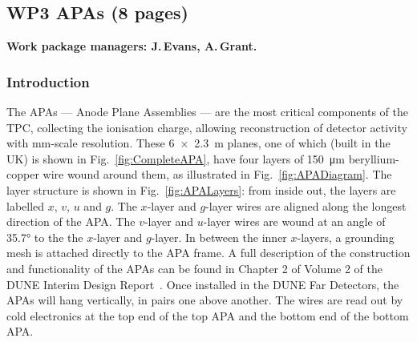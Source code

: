 \subsection{WP3 APAs (8 pages)}

{\bf Work package managers: J.\,Evans, A.\,Grant.}

\subsubsection{Introduction}

The APAs --- Anode Plane Assemblies --- are the most critical components of the TPC, collecting the ionisation charge, allowing reconstruction of detector activity with mm-scale resolution. These \SI{6x 2.3}{\metre} planes, one of which (built in the UK) is shown in Fig.~\ref{fig:CompleteAPA}, have four layers of \SI{150}{\micro\metre} beryllium-copper wire wound around them, as illustrated in Fig.~\ref{fig:APADiagram}. The layer structure is shown in Fig.~\ref{fig:APALayers}: from inside out, the layers are labelled $x$, $v$, $u$ and $g$. The $x$-layer and $g$-layer wires are aligned along the longest direction of the APA. The $v$-layer and $u$-layer wires are wound at an angle of \ang{35.7} to the the $x$-layer and $g$-layer. In between the inner $x$-layers, a grounding mesh is attached directly to the APA frame. A full description of the construction and functionality of the APAs can be found in Chapter 2 of Volume 2 of the DUNE Interim Design Report~\cite{ref:DUNEIDR}. Once installed in the DUNE Far Detectors, the APAs will hang vertically, in pairs one above another. The wires are read out by cold electronics at the top end of the top APA and the bottom end of the bottom APA.

